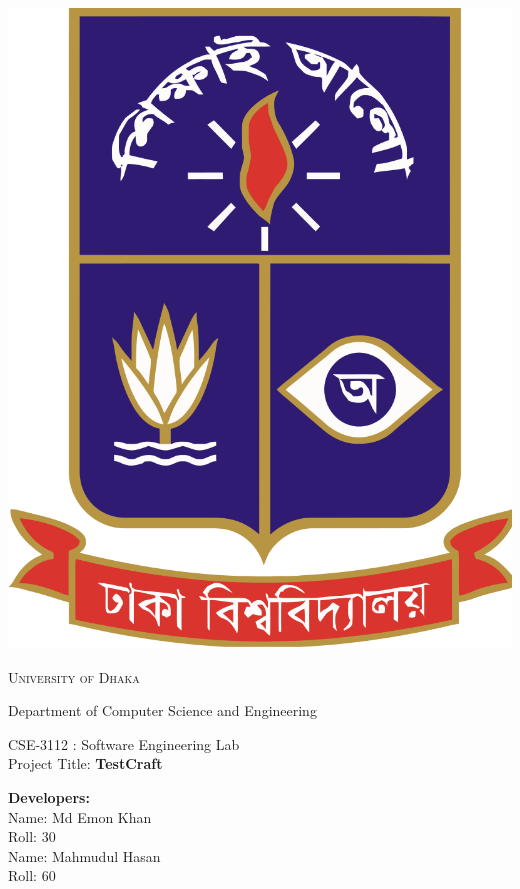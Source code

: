 \documentclass[11pt]{article}
\newcommand{\projectTitle}{\textbf{TestCraft}} %
\begin{document}
\begin{titlepage}
    \begin{center}
        \includegraphics[scale=0.10]{du.png}\par
        \begin{Huge}
            \textsc{University of Dhaka}\par
        \end{Huge}
        \begin{Large}
            Department of Computer Science and Engineering\par
            \vspace{1cm}
            CSE-3112 : Software Engineering Lab \\[12pt]
            Project Title: \projectTitle
        \end{Large}
    \end{center}
    \vfill
    \begin{Large}
        \textbf{Developers:\\[12pt]}
        Name: Md Emon Khan \\[8pt]
        Roll: 30 \\[12pt]
        Name: Mahmudul Hasan \\[8pt]
        Roll: 60 \\[12pt]
    \end{Large}
\end{titlepage}
\newpage
\end{document}
